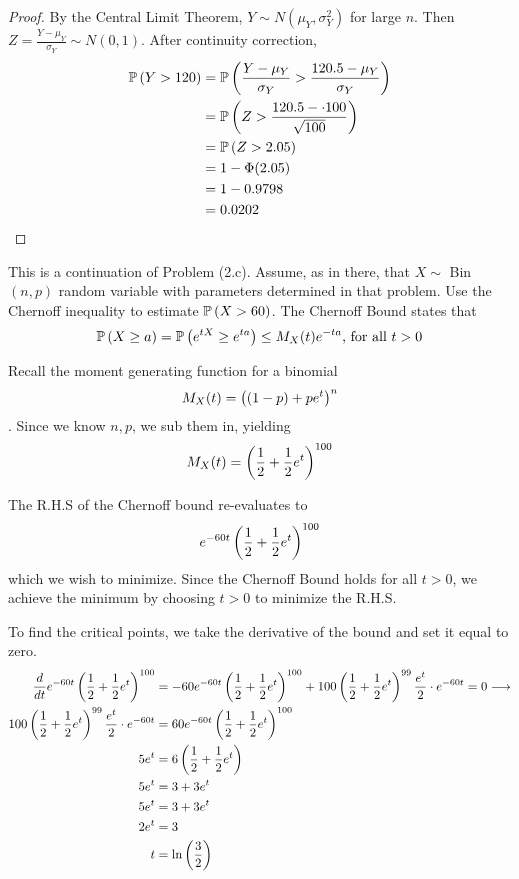 \documentclass{exam}
\begin{document}
\begin{questions}
\begin{parts}
\begin{proof}
        By the Central Limit Theorem, $Y\sim N(\mu_Y, \sigma_Y^2)$ for large $n$. Then $Z = \frac{Y - \mu_Y}{\sigma_Y}\sim N(0, 1)$. After continuity correction,
        \begin{align*}
            \mathbb{P}\left( Y > 120 \right) &= \mathbb{P}\left( \frac{Y - \mu_Y}{\sigma_Y} > \frac{120.5 - \mu_Y}{\sigma_Y} \right) \\
            &= \mathbb{P}\left( Z > \frac{120.5 - \cdot100}{\sqrt{100}} \right) \\
            &= \mathbb{P}\left( Z > 2.05 \right) \\
            &= 1 - \Phi (2.05) \\
            &= 1 - 0.9798 \\
            &= 0.0202
        \end{align*}
    \end{proof}
\end{parts}


\newpage
\question
This is a continuation of Problem (2.c). Assume, as in there, that $X\sim$ Bin$(n, p)$ random variable with parameters determined in that problem. Use the Chernoff inequality to estimate $\mathbb{P}\left( X > 60 \right)$.
\sol
The Chernoff Bound states that
$$\mathbb{P}\left( X \geq a \right) = \mathbb{P}\left( e^{tX} \geq e^{ta} \right) \leq M_X(t)e^{-ta}\text{, for all } t > 0$$

Recall the moment generating function for a binomial
$$M_X(t) = \left( (1 - p) + pe^t \right)^n$$.
Since we know $n, p$, we sub them in, yielding
$$M_X(t) = \left( \frac{1}{2} + \frac{1}{2}e^t \right)^{100}$$

The R.H.S of the Chernoff bound re-evaluates to 
$$e^{-60t}\left( \frac{1}{2} + \frac{1}{2}e^t \right)^{100}$$
which we wish to minimize. Since the Chernoff Bound holds for all $t > 0$, we achieve the minimum by choosing $t > 0$ to minimize the R.H.S.

To find the critical points, we take the derivative of the bound and set it equal to zero.
\begin{align*}
    \frac{d}{dt} e^{-60t}\left( \frac{1}{2} + \frac{1}{2}e^t \right)^{100} &= -60e^{-60t}\left( \frac{1}{2} + \frac{1}{2}e^t \right)^{100} + 100\left( \frac{1}{2} + \frac{1}{2}e^t \right)^{99}\frac{e^t}{2}\cdot e^{-60t} = 0 \longrightarrow\\
    100\left( \frac{1}{2} + \frac{1}{2}e^t \right)^{99}\frac{e^t}{2}\cdot e^{-60t} &= 60e^{-60t}\left( \frac{1}{2} + \frac{1}{2}e^t \right)^{100} \\
    5e^t &= 6\left( \frac{1}{2} + \frac{1}{2}e^t \right) \\
    5e^t &= 3 + 3e^t \\
    5e^t &= 3 + 3e^t \\
    2e^t &= 3\\
    t &= \ln \left( \frac{3}{2} \right)
\end{align*}


\end{questions}
\end{document}
